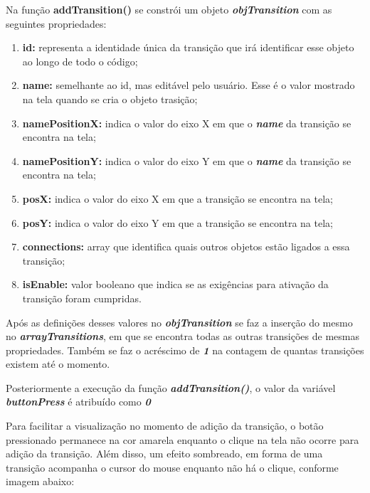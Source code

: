 \documentclass[
	12pt,				%
	openright,			%
	oneside,			%
	a4paper,			%
	english,			%
	brazil				%
	]{abntex2}
\begin{document}


Na função \textbf{addTransition()} se constrói um objeto \textbf{\textit{objTransition}} com as seguintes propriedades:

\begin{enumerate}
	\item \textbf{id:} representa a identidade única da transição que irá identificar esse objeto ao longo de todo o código;
	\item \textbf{name:} semelhante ao id, mas editável pelo usuário. Esse é o valor mostrado na tela quando se cria o objeto trasição;
	\item \textbf{namePositionX:} indica o valor do eixo X em que o \textbf{\textit{name}} da transição se encontra na tela;
	\item \textbf{namePositionY:} indica o valor do eixo Y em que o \textbf{\textit{name}} da transição se encontra na tela;
	\item \textbf{posX:} indica o valor do eixo X em que a transição se encontra na tela;
	\item \textbf{posY:} indica o valor do eixo Y em que a transição se encontra na tela;
	\item \textbf{connections:} array que identifica quais outros objetos estão ligados a essa transição;
	\item \textbf{isEnable:} valor booleano que indica se as exigências para ativação da transição foram cumpridas.
\end{enumerate}

Após as definições desses valores no \textbf{\textit{objTransition}} se faz a inserção do mesmo no \textbf{\textit{arrayTransitions}}, em que se encontra todas as outras transições de mesmas propriedades. Também se faz o acréscimo de \textbf{\textit{1}} na contagem de quantas transições existem até o momento.



Posteriormente a execução da função \textbf{\textit{addTransition()}}, o valor da variável \textbf{\textit{buttonPress}} é atribuído como \textbf{\textit{0}}

Para facilitar a visualização no momento de adição da transição, o botão pressionado permanece na cor amarela enquanto o clique na tela não ocorre para adição da transição. Além disso, um efeito sombreado, em forma de uma transição acompanha o cursor do mouse enquanto não há o clique, conforme imagem abaixo: 
\end{document}
